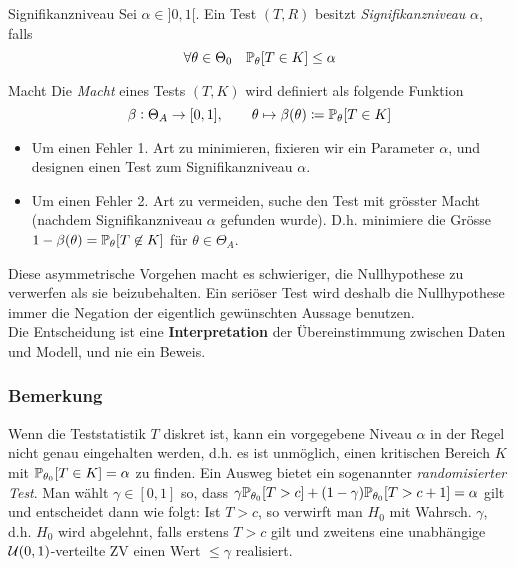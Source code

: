 \begin{definition}{Signifikanzniveau}
	Sei $\alpha \in ]0,1[$. Ein Test $(T,R)$ besitzt \emph{Signifikanzniveau} $\alpha$, falls
	\begin{equation*}
		\forall \theta \in \Theta_0 \quad \mathbb{P}_\theta [T \in K] \leq \alpha
	\end{equation*}
\end{definition}
\begin{definition}{Macht}
	Die \emph{Macht} eines Tests $(T,K)$ wird definiert als folgende Funktion
	\begin{equation*}
		\beta : \Theta_A \rightarrow [0,1], \qquad \theta \mapsto \beta(\theta) \coloneqq \mathbb{P}_\theta [T \in K]
	\end{equation*}
\end{definition}
\begin{itemize}
	\item Um einen Fehler 1. Art zu minimieren, fixieren wir ein Parameter $\alpha$, und designen einen Test zum
		Signifikanzniveau $\alpha$.
	\item Um einen Fehler 2. Art zu vermeiden, suche den Test mit grösster Macht (nachdem Signifikanzniveau $\alpha$
		gefunden wurde). D.h. minimiere die Grösse $1 - \beta(\theta) = \mathbb{P}_\theta [T \not\in K]$ für $\theta \in
		\Theta_A$.
\end{itemize}
Diese asymmetrische Vorgehen macht es schwieriger, die Nullhypothese zu verwerfen als sie beizubehalten. Ein seriöser
Test wird deshalb die Nullhypothese immer die Negation der eigentlich gewünschten Aussage benutzen.\\
Die Entscheidung ist eine \textbf{Interpretation} der Übereinstimmung zwischen Daten und Modell, und nie ein Beweis.

\subsubsection*{Bemerkung}%
\label{ssub:bemerkung}

Wenn die Teststatistik $T$ diskret ist, kann ein vorgegebene Niveau $\alpha$ in der Regel nicht genau eingehalten
werden, d.h. es ist unmöglich, einen kritischen Bereich $K$ mit $\mathbb{P}_{\theta_0} [T \in K] = \alpha$ zu finden. Ein
Ausweg bietet ein sogenannter \emph{randomisierter Test}. Man wählt $ \gamma \in [0,1]$ so, dass $\gamma \mathbb{P}_{\theta_0}
[T > c] + (1- \gamma) \mathbb{P}_{\theta_0} [T > c + 1] = \alpha$ gilt und entscheidet dann wie folgt: Ist $ T > c$, so
verwirft man $H_0$ mit Wahrsch. $\gamma$, d.h. $H_0$ wird abgelehnt, falls erstens $T > c$ gilt und zweitens eine
unabhängige $\mathcal{U} (0,1)$-verteilte ZV einen Wert $\leq \gamma$ realisiert.

